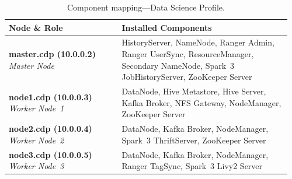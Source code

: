 \begin{table}[htbp]
  \centering
  \caption{Component mapping---Data Science Profile.}
  \label{tab:comp-data-science}
  \renewcommand{\arraystretch}{1.2}
  \begin{tabular}{@{} p{0.38\linewidth} p{0.58\linewidth} @{}}
    \hline
    \textbf{Node \& Role} & \textbf{Installed Components} \\
    \hline
    \textbf{master.cdp (10.0.0.2)} \newline \textit{Master Node} & HistoryServer, NameNode, Ranger Admin, Ranger UserSync, ResourceManager, Secondary NameNode, Spark~3 JobHistoryServer, ZooKeeper Server \\
    \hline
    \textbf{node1.cdp (10.0.0.3)} \newline \textit{Worker Node~1} & DataNode, Hive Metastore, Hive Server, Kafka Broker, NFS Gateway, NodeManager, ZooKeeper Server \\
    \hline
    \textbf{node2.cdp (10.0.0.4)} \newline \textit{Worker Node~2} & DataNode, Kafka Broker, NodeManager, Spark~3 ThriftServer, ZooKeeper Server \\
    \hline
    \textbf{node3.cdp (10.0.0.5)} \newline \textit{Worker Node~3} & DataNode, Kafka Broker, NodeManager, Ranger TagSync, Spark~3 Livy2 Server \\
    \hline
  \end{tabular}
\end{table}
